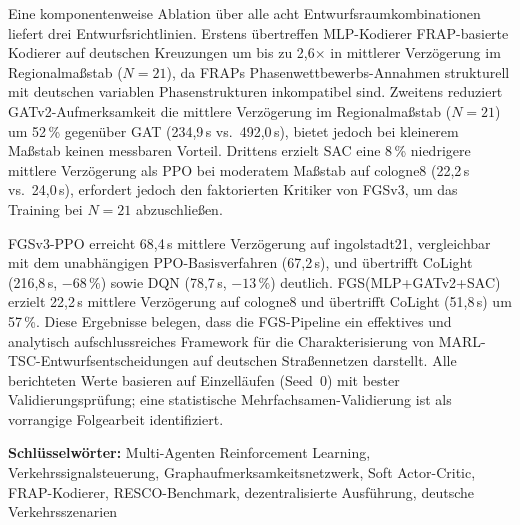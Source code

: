 Eine komponentenweise Ablation über alle acht Entwurfsraumkombinationen liefert drei Entwurfsrichtlinien. Erstens übertreffen MLP-Kodierer FRAP-basierte Kodierer auf deutschen Kreuzungen um bis zu 2,6$\times$ in mittlerer Verzögerung im Regionalmaßstab ($N=21$), da FRAPs Phasenwettbewerbs-Annahmen strukturell mit deutschen variablen Phasenstrukturen inkompatibel sind. Zweitens reduziert GATv2-Aufmerksamkeit die mittlere Verzögerung im Regionalmaßstab ($N=21$) um 52\,\% gegenüber GAT (234,9\,s vs.\ 492,0\,s), bietet jedoch bei kleinerem Maßstab keinen messbaren Vorteil. Drittens erzielt SAC eine 8\,\% niedrigere mittlere Verzögerung als PPO bei moderatem Maßstab auf cologne8 (22,2\,s vs.\ 24,0\,s), erfordert jedoch den faktorierten Kritiker von FGSv3, um das Training bei $N=21$ abzuschließen.

FGSv3-PPO erreicht 68,4\,s mittlere Verzögerung auf ingolstadt21, vergleichbar mit dem unabhängigen PPO-Basisverfahren (67,2\,s), und übertrifft CoLight (216,8\,s, $-68\,\%$) sowie DQN (78,7\,s, $-13\,\%$) deutlich. FGS(MLP+GATv2+SAC) erzielt 22,2\,s mittlere Verzögerung auf cologne8 und übertrifft CoLight (51,8\,s) um 57\,\%. Diese Ergebnisse belegen, dass die FGS-Pipeline ein effektives und analytisch aufschlussreiches Framework für die Charakterisierung von MARL-TSC-Entwurfsentscheidungen auf deutschen Straßennetzen darstellt. Alle berichteten Werte basieren auf Einzelläufen (Seed~0) mit bester Validierungsprüfung; eine statistische Mehrfachsamen-Validierung ist als vorrangige Folgearbeit identifiziert.

\medskip
\noindent\textbf{Schlüsselwörter:} Multi-Agenten Reinforcement Learning, Verkehrssignalsteuerung, Graphaufmerksamkeitsnetzwerk, Soft Actor-Critic, FRAP-Kodierer, RESCO-Benchmark, dezentralisierte Ausführung, deutsche Verkehrsszenarien
